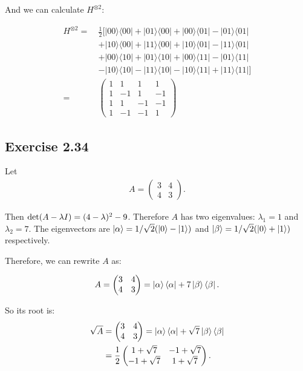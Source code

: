 And we can calculate $H^{\otimes 2}$:

\begin{align}
H^{\otimes 2}=~& \frac{1}{2}[|00\rangle\langle 00|+| 01\rangle\langle 00|+| 00\rangle\langle 01|-| 01\rangle\langle 01|\\
&+|10\rangle\langle 00|+| 11\rangle\langle 00|+| 10\rangle\langle 01|-| 11\rangle\langle 01| \\
&+|00\rangle\langle 10|+| 01\rangle\langle 10|+| 00\rangle\langle 11|-| 01\rangle\langle 11| \\
&-|10\rangle\langle 10|-| 11\rangle\langle 10|-| 10\rangle\langle 11|+| 11\rangle\langle 11|] \\
=&\begin{pmatrix}
1 & 1 & 1 & 1 \\
1 & -1 & 1 & -1 \\
1 & 1 & -1 & -1 \\
1 & -1 & -1 & 1
\end{pmatrix}
\end{align}

\subsection*{Exercise 2.34}
Let 
\begin{align}
A=\begin{pmatrix}3 &4\\4 &3\end{pmatrix}.
\end{align}

Then ${\rm det}(A-\lambda I)=(4-\lambda)^2-9$. Therefore $A$ has two eigenvalues: $\lambda_1=1$ and $\lambda_2 = 7$. The eigenvectors are $\ket{\alpha}=1/\sqrt 2(\ket{0}-\ket{1})$ and $\ket{\beta}=1/\sqrt 2(\ket{0}+\ket{1})$ respectively.

Therefore, we can rewrite $A$ as:

\begin{align}
A=\begin{pmatrix}3 &4\\4 &3\end{pmatrix}=\ket{\alpha}\bra{\alpha}+7\ket{\beta}\bra{\beta}.
\end{align}

So its root is:
\begin{align}
\sqrt A&=\begin{pmatrix}3 &4\\4 &3\end{pmatrix}=\ket{\alpha}\bra{\alpha}+\sqrt 7\ket{\beta}\bra{\beta}\\
&=\frac{1}{2}\begin{pmatrix}1+\sqrt 7 &-1+\sqrt 7\\-1+\sqrt 7 &1+\sqrt 7\end{pmatrix}.
\end{align}

